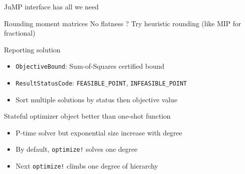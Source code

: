 \documentclass{beamer}
\begin{document}
\begin{frame}{JuMP interface has all we need}
  \begin{block}{Rounding moment matrices}
    No flatness ? Try \alert{heuristic} rounding (like MIP for fractional)
  \end{block}

  \begin{block}{Reporting solution}
    \begin{itemize}
      \item \texttt{ObjectiveBound}: Sum-of-Squares certified bound
      \item \texttt{ResultStatusCode}: \texttt{FEASIBLE\_POINT}, \texttt{INFEASIBLE\_POINT}
      \item Sort \alert{multiple} solutions by status then objective value
    \end{itemize}
  \end{block}

  \begin{block}{Stateful optimizer object better than one-shot function}
    \begin{itemize}
      \item \alert{P}-time solver but \alert{exp}onential size increase with degree
      \item By default, \texttt{optimize!} solves one degree
      \item Next \texttt{optimize!} climbs one degree of hierarchy
    \end{itemize}
  \end{block}
%
%
%
%
%
\end{frame}
\end{document}
